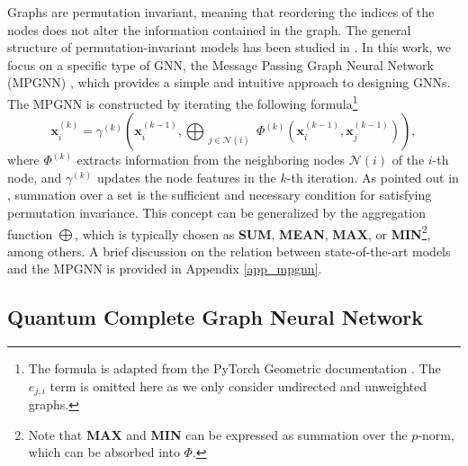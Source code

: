 \documentclass[reprint,amsmath,amssymb,prd,nofootinbib]{revtex4-2}
\def\xbf{\mathbf{x}}
\begin{document}
Graphs are permutation invariant, meaning that reordering the indices of the nodes does not alter the information contained in the graph. The general structure of permutation-invariant models has been studied in \cite{deepset,pfn}. In this work, we focus on a specific type of GNN, the Message Passing Graph Neural Network (MPGNN) \cite{mpn1}, which provides a simple and intuitive approach to designing GNNs. The MPGNN is constructed by iterating the following formula\footnote{The formula is adapted from the PyTorch Geometric documentation \urlmpgnn. The $e_{j,i}$ term is omitted here as we only consider undirected and unweighted graphs.}
\begin{equation} \label{eqmp}
    \xbf^{(k)}_i=\gamma^{(k)}\left(\xbf^{(k-1)}_i,\bigoplus_{\substack{j\in \mathcal{N}(i)}}\Phi^{(k)}(\xbf^{(k-1)}_i,\xbf^{(k-1)}_j)\right),
\end{equation}
where $\Phi^{(k)}$ extracts information from the neighboring nodes $\mathcal{N}(i)$ of the $i$-th node, and $\gamma^{(k)}$ updates the node features in the $k$-th iteration. As pointed out in \cite{deepset}, summation over a set is the sufficient and necessary condition for satisfying permutation invariance. This concept can be generalized by the aggregation function $\bigoplus$, which is typically chosen as \textbf{SUM}, \textbf{MEAN}, \textbf{MAX}, or \textbf{MIN}\footnote{Note that \textbf{MAX} and \textbf{MIN} can be expressed as summation over the $p$-norm, which can be absorbed into $\Phi$.}, among others. A brief discussion on the relation between state-of-the-art models and the MPGNN is provided in Appendix \ref{app_mpgnn}.

\subsection{Quantum Complete Graph Neural Network} \label{sec_qcgnn}
\end{document}
